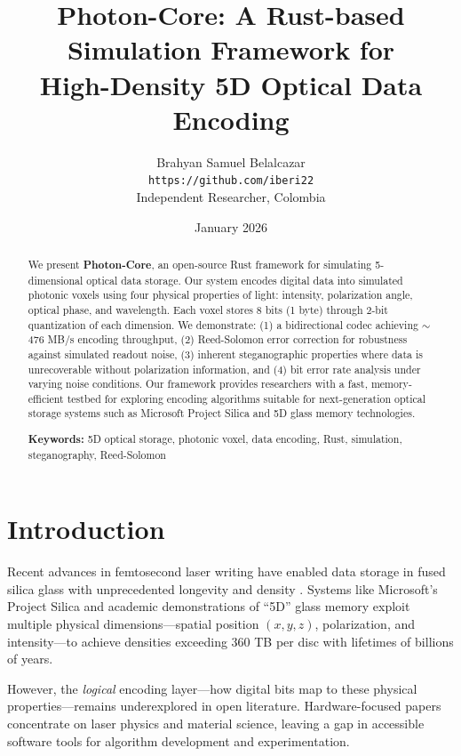 \documentclass[11pt,a4paper]{article}
\title{Photon-Core: A Rust-based Simulation Framework for\\High-Density 5D Optical Data Encoding}
\author{
    Brahyan Samuel Belalcazar\\
    \texttt{https://github.com/iberi22}\\
    Independent Researcher, Colombia
}
\date{January 2026}
\begin{document}
\maketitle

\begin{abstract}
We present \textbf{Photon-Core}, an open-source Rust framework for simulating 5-dimensional optical data storage. Our system encodes digital data into simulated photonic voxels using four physical properties of light: intensity, polarization angle, optical phase, and wavelength. Each voxel stores 8 bits (1 byte) through 2-bit quantization of each dimension. We demonstrate: (1) a bidirectional codec achieving $\sim$476 MB/s encoding throughput, (2) Reed-Solomon error correction for robustness against simulated readout noise, (3) inherent steganographic properties where data is unrecoverable without polarization information, and (4) bit error rate analysis under varying noise conditions. Our framework provides researchers with a fast, memory-efficient testbed for exploring encoding algorithms suitable for next-generation optical storage systems such as Microsoft Project Silica and 5D glass memory technologies.

\textbf{Keywords:} 5D optical storage, photonic voxel, data encoding, Rust, simulation, steganography, Reed-Solomon
\end{abstract}

\section{Introduction}

Recent advances in femtosecond laser writing have enabled data storage in fused silica glass with unprecedented longevity and density \cite{wang2024}. Systems like Microsoft's Project Silica and academic demonstrations of ``5D'' glass memory exploit multiple physical dimensions---spatial position $(x, y, z)$, polarization, and intensity---to achieve densities exceeding 360 TB per disc with lifetimes of billions of years.

However, the \textit{logical} encoding layer---how digital bits map to these physical properties---remains underexplored in open literature. Hardware-focused papers concentrate on laser physics and material science, leaving a gap in accessible software tools for algorithm development and experimentation.
\end{document}
